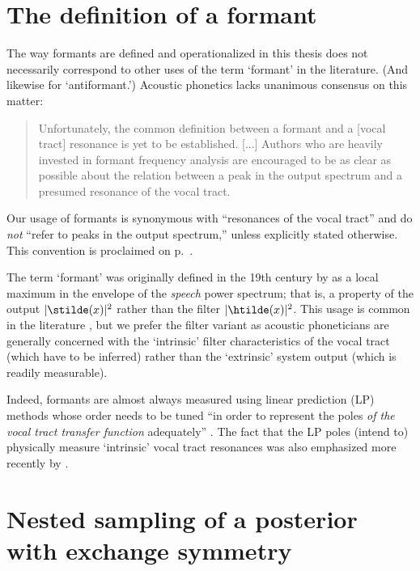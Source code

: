 \begin{chapterappendices}{6}
	
\section{The definition of a formant}

The way formants are defined and operationalized in this thesis does not necessarily correspond to other uses of the term `formant' in the literature. (And likewise for `antiformant.')
Acoustic phonetics lacks unanimous consensus on this matter:
\begin{quote}
	Unfortunately, the common definition between a formant and a [vocal tract] resonance is yet to be established. [...] Authors who are heavily invested in formant frequency analysis are encouraged to be as clear as possible about the relation between a peak in the output spectrum and a presumed resonance of the
	vocal tract. \citep[][p.~3006]{Titze2015}
\end{quote}
Our usage of formants is synonymous with ``resonances of the
vocal tract'' and do \emph{not} ``refer to peaks in the output spectrum,'' unless explicitly stated otherwise.
This convention is proclaimed on p.~\pageref{chapter:conventions}.

The term `formant' was originally defined in the 19th century by \cite{Hermann1889} as a local maximum in the envelope of the \emph{speech} power spectrum; that is, a property of the output $|\stilde(x)|^2$ rather than the filter $|\htilde(x)|^2$.
This usage is common in the literature \citep{Titze2015}, but we prefer the filter variant as acoustic phoneticians are generally concerned with the `intrinsic' filter characteristics of the vocal tract (which have to be inferred) rather than the `extrinsic' system output (which is readily measurable).

Indeed, formants are almost always measured using linear prediction (LP) methods whose order needs to be tuned ``in order to represent
the poles \emph{of the vocal tract transfer function} adequately'' \citep[emphasis ours;][p.~639]{Atal1971}.
The fact that the LP poles (intend to) physically measure `intrinsic' vocal tract resonances was also emphasized more recently by \cite[][p.~179]{Fulop2011}.

\section{Nested sampling of a posterior with exchange symmetry\label{nested-exchange}}


\end{chapterappendices}
